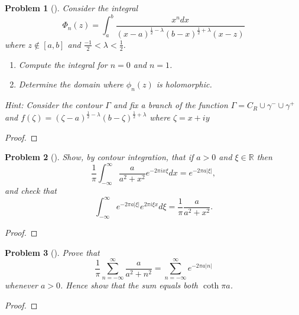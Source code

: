 \documentclass[10pt]{article}
\newcommand{\sk}{\vskip 10mm}
\theoremstyle{plain}
\newtheorem{problem}{Problem}
\theoremstyle{remark}
\begin{document}
\begin{problem}[]
  Consider the integral
  \[
    \Phi_n(z) = \int_a^b \frac{x^ndx}{(x-a)^{\frac{1}{2}-\lambda} (b-x)^{\frac{1}{2}+ \lambda} (x-z)}
  \]
  where $z \notin [a,b]$ and $\frac{-1}{2} < \lambda < \frac{1}{2}$.
  
  \begin{enumerate}
  \item[(a)] Compute the integral for $n= 0$ and $n=1$.
  \item[(b)] Determine the domain where $\phi_n(z)$ is holomorphic.
  \end{enumerate}
  
  Hint: Consider the contour $\Gamma$ and fix a branch of the function
  $\Gamma = C_R \cup \gamma^- \cup \gamma^+$ and
  $f(\zeta) = (\zeta - a)^{\frac{1}{2} - \lambda}(b- \zeta) ^{\frac{1}{2} + \lambda}$
  where $\zeta = x+ iy$
\end{problem}

\begin{proof}
  
\end{proof}

\sk

\begin{problem}[]
  Show, by contour integration, that if $a >0$ and $\xi \in \mathbb{R}$ then
  \[
    \frac{1}{\pi} \int_{-\infty}^\infty 
    \frac{a}{a^2 + x^2}e^{-2\pi ix\xi}dx = e^{-2\pi a |\xi|},
  \]
  and check that 
  \[
    \int_{-\infty}^\infty 
    e^{-2\pi a|\xi|}e^{2\pi i\xi x}d\xi = \frac{1}{\pi}  
    \frac{a}{a^2 + x^2}.
  \]
\end{problem}

\begin{proof}
  
\end{proof}

\sk

\begin{problem}[]
  Prove that 
  \[
    \frac{1}{\pi} \sum_{n = -\infty}^\infty 
    \frac{a}{a^2 + n^2} = \sum_{n = -\infty}^\infty e^{-2\pi a|n|}
  \]
  whenever $a>0$. Hence show that the sum equals both $\coth \pi a$.
\end{problem}

\begin{proof}
  
\end{proof}

\sk
\end{document}
